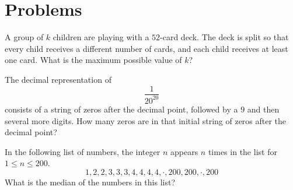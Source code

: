 \documentclass[mast]{lucky}
\begin{document}
\pagebreak

\section{Problems}

\minpt{}

\psetquote{}{}

\begin{prob}[CMC 10B 2020/4]{2}
A group of $k$ children are playing with a $52$-card deck.  The deck is split so that every child receives a different number of cards, and each child receives at least one card. What is the maximum possible value of $k$?
\end{prob}

\begin{req}[AMC 10B 2020/12]{3}
The decimal representation of \[\frac{1}{20^{20}}\] consists of a string of zeros after the decimal point, followed by a $9$ and then several more digits. How many zeros are in that initial string of zeros after the decimal point?

\end{req}

\begin{prob}[AMC 10A 2021/16]{4}
In the following list of numbers, the integer $n$ appears $n$ times in the list for $1 \leq n \leq 200$.
$$1, 2, 2, 3, 3, 3, 4, 4, 4, 4, \cdot, 200, 200, \cdot , 200$$What is the median of the numbers in this list?

\end{prob}
\end{document}
